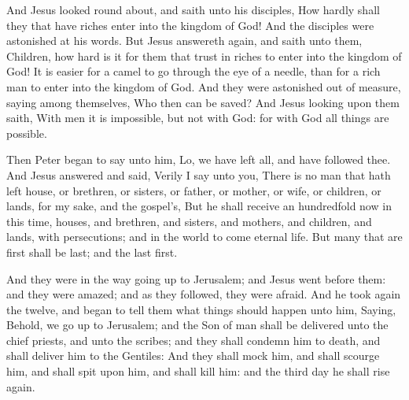  And Jesus looked round about, and saith unto his
disciples, How hardly shall they that have riches enter into the kingdom
of God!  And the disciples were astonished at his words.
But Jesus answereth again, and saith unto them, Children, how hard is it
for them that trust in riches to enter into the kingdom of God!
 It is easier for a camel to go through the eye of a
needle, than for a rich man to enter into the kingdom of God.
 And they were astonished out of measure, saying among
themselves, Who then can be saved?  And Jesus looking
upon them saith, With men it is impossible, but not with God: for with
God all things are possible.

 Then Peter began to say unto him, Lo, we have left all,
and have followed thee.  And Jesus answered and said,
Verily I say unto you, There is no man that hath left house, or
brethren, or sisters, or father, or mother, or wife, or children, or
lands, for my sake, and the gospel's,  But he shall
receive an hundredfold now in this time, houses, and brethren, and
sisters, and mothers, and children, and lands, with persecutions; and in
the world to come eternal life.  But many that are first
shall be last; and the last first.

 And they were in the way going up to Jerusalem; and
Jesus went before them: and they were amazed; and as they followed, they
were afraid. And he took again the twelve, and began to tell them what
things should happen unto him,  Saying, Behold, we go up
to Jerusalem; and the Son of man shall be delivered unto the chief
priests, and unto the scribes; and they shall condemn him to death, and
shall deliver him to the Gentiles:  And they shall mock
him, and shall scourge him, and shall spit upon him, and shall kill him:
and the third day he shall rise again.

